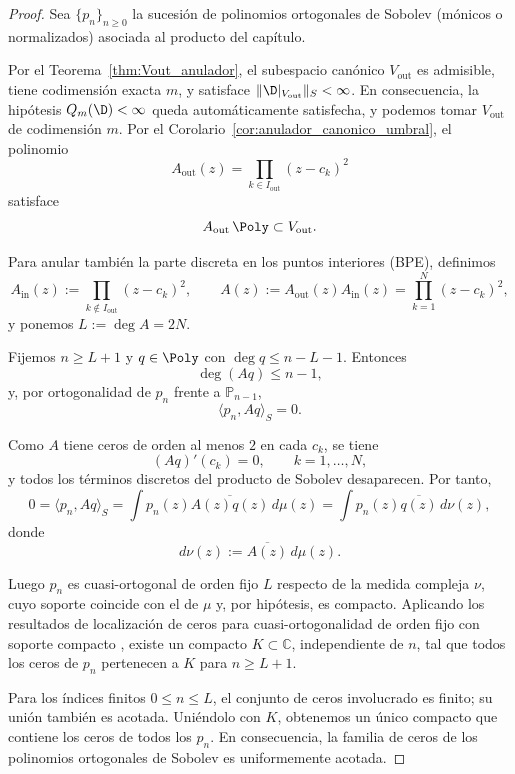 \begin{proof}
	Sea $\{p_n\}_{n\ge0}$ la sucesión de polinomios ortogonales de Sobolev (mónicos o normalizados) asociada al producto del capítulo.

	Por el Teorema~\ref{thm:Vout_anulador}, el subespacio canónico
	\(
	V_{\mathrm{out}}
	\)
	es admisible, tiene codimensión exacta $m$, y satisface $\|\D|_{V_{\mathrm{out}}}\|_S<\infty$. En consecuencia, la hipótesis $Q_m(\D)<\infty$ queda automáticamente satisfecha, y podemos tomar $V_{\mathrm{out}}$
	de codimensión $m$. Por el Corolario~\ref{cor:anulador_canonico_umbral}, el polinomio
	\[
		A_{\mathrm{out}}(z)=\prod_{k\in I_{\mathrm{out}}}(z-c_k)^2
	\]
	satisface
	\[
		A_{\mathrm{out}}\,\Poly\subset V_{\mathrm{out}}.
	\]

	Para anular también la parte discreta en los puntos interiores (BPE), definimos
	\[
		A_{\mathrm{in}}(z):=\prod_{k\notin I_{\mathrm{out}}}(z-c_k)^2,
		\qquad
		A(z):=A_{\mathrm{out}}(z)A_{\mathrm{in}}(z)=\prod_{k=1}^N (z-c_k)^2,
	\]
	y ponemos $L:=\deg A=2N$.

	Fijemos $n\ge L+1$ y $q\in\Poly$ con $\deg q\le n-L-1$. Entonces
	\[
		\deg(Aq)\le n-1,
	\]
	y, por ortogonalidad de $p_n$ frente a $\mathbb P_{n-1}$,
	\[
		\langle p_n,Aq\rangle_S=0.
	\]

	Como $A$ tiene ceros de orden al menos $2$ en cada $c_k$, se tiene
	\[
		(Aq)'(c_k)=0,
		\qquad k=1,\dots,N,
	\]
	y todos los términos discretos del producto de Sobolev desaparecen. Por tanto,
	\[
		0=\langle p_n,Aq\rangle_S
		=\int p_n(z)\overline{A(z)q(z)}\,d\mu(z)
		=\int p_n(z)\overline{q(z)}\,d\nu(z),
	\]
	donde
	\[
		d\nu(z):=\overline{A(z)}\,d\mu(z).
	\]

	Luego $p_n$ es cuasi-ortogonal de orden fijo $L$ respecto de la medida compleja $\nu$, cuyo soporte coincide con el de $\mu$ y, por hipótesis, es compacto. Aplicando los resultados de localización de ceros para cuasi-ortogonalidad de orden fijo con soporte compacto \cite{lopez1999zero,lopez2001sobolev,marcellan2015sobolev}, existe un compacto $K\subset\mathbb C$, independiente de $n$, tal que todos los ceros de $p_n$ pertenecen a $K$ para $n\ge L+1$.

	Para los índices finitos $0\le n\le L$, el conjunto de ceros involucrado es finito; su unión también es acotada. Uniéndolo con $K$, obtenemos un único compacto que contiene los ceros de todos los $p_n$. En consecuencia, la familia de ceros de los polinomios ortogonales de Sobolev es uniformemente acotada.
\end{proof}

